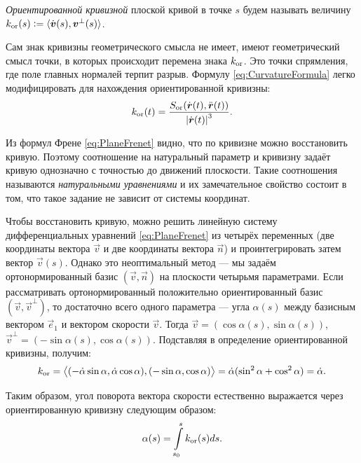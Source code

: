 \begin{definition}
	\textit{Ориентированной кривизной} плоской кривой в точке $s$ будем называть величину $k_{\mathrm{or}}(s) \vcentcolon = \langle\dot{\boldsymbol{v}}(s), \boldsymbol{v}^\perp(s)\rangle$.
\end{definition}

Сам знак кривизны геометрического смысла не имеет, имеют геометрический смысл точки, в которых происходит перемена знака $k_{\mathrm{or}}$. Это точки спрямления, где поле главных нормалей терпит разрыв. Формулу \eqref{eq:CurvatureFormula} легко модифицировать для нахождения ориентированной кривизны:
\begin{equation} \label{eq:OrientedCurvature}
	k_{\mathrm{or}}(t) = \frac{S_{\mathrm{or}}(\dot{\boldsymbol{r}}(t), \ddot{\boldsymbol{r}}(t))}{\left\lvert\dot{\boldsymbol{r}}(t)\right\rvert^3}.
\end{equation}

Из формул Френе \eqref{eq:PlaneFrenet} видно, что по кривизне можно восстановить кривую. Поэтому соотношение на натуральный параметр и кривизну задаёт кривую однозначно с точностью до движений плоскости. Такие соотношения называются \textit{натуральными уравнениями} и их замечательное свойство состоит в том, что такое задание не зависит от системы координат.

Чтобы восстановить кривую, можно решить линейную систему дифференциальных уравнений \eqref{eq:PlaneFrenet} из четырёх переменных (две координаты вектора $\vec{v}$ и две координаты вектора $\vec{n}$) и проинтегрировать затем вектор $\vec{v}(s)$. Однако это неоптимальный метод --- мы задаём ортонормированный базис $(\vec{v}, \vec{n})$ на плоскости четырьмя параметрами. Если рассматривать ортонормированный положительно ориентированный базис $(\vec{v}, \vec{v}^{\perp})$, то достаточно всего одного параметра --- угла $\alpha(s)$ между базисным вектором $\vec{e}_1$ и вектором скорости $\vec{v}$. Тогда $\vec{v} = (\cos\alpha(s), \sin\alpha(s))$, $\vec{v}^\perp = (-\sin\alpha(s), \cos\alpha(s))$. Подставляя в определение ориентированной кривизны, получим:
\[
	k_{\mathrm{or}} = \big\langle(-\dot{\alpha}\sin\alpha, \dot{\alpha}\cos\alpha), (-\sin\alpha, \cos\alpha)\big\rangle = \dot{\alpha}(\sin^2\alpha + \cos^2\alpha) = \dot{\alpha}.
\]

Таким образом, угол поворота вектора скорости естественно выражается через ориентированную кривизну следующим образом:
\begin{equation} \label{eq:AngleByCurvature}
	\alpha(s) = \int\limits_{s_0}^sk_{\mathrm{or}}(s)ds.
\end{equation}

